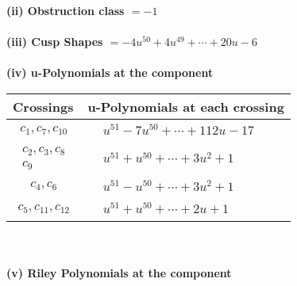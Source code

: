 \documentclass[1p]{elsarticle_modified}
\theoremstyle{definition}
\begin{document}
\flushleft \textbf{(ii) Obstruction class $= -1$}\\~\\
\flushleft \textbf{(iii) Cusp Shapes $= -4 u^{50}+4 u^{49}+\cdots+20 u-6$}\\~\\
\newpage\renewcommand{\arraystretch}{1}
\flushleft \textbf{(iv) u-Polynomials at the component}\newline \\
\begin{tabular}{m{50pt}|m{274pt}}
Crossings & \hspace{64pt}u-Polynomials at each crossing \\
\hline $$\begin{aligned}c_{1},c_{7},c_{10}\end{aligned}$$&$\begin{aligned}
&u^{51}-7 u^{50}+\cdots+112 u-17
\end{aligned}$\\
\hline $$\begin{aligned}c_{2},c_{3},c_{8}\\c_{9}\end{aligned}$$&$\begin{aligned}
&u^{51}+u^{50}+\cdots+3 u^2+1
\end{aligned}$\\
\hline $$\begin{aligned}c_{4},c_{6}\end{aligned}$$&$\begin{aligned}
&u^{51}- u^{50}+\cdots+3 u^2+1
\end{aligned}$\\
\hline $$\begin{aligned}c_{5},c_{11},c_{12}\end{aligned}$$&$\begin{aligned}
&u^{51}+u^{50}+\cdots+2 u+1
\end{aligned}$\\
\hline
\end{tabular}\\~\\
\newpage\renewcommand{\arraystretch}{1}
\flushleft \textbf{(v) Riley Polynomials at the component}\newline \\
\end{document}
